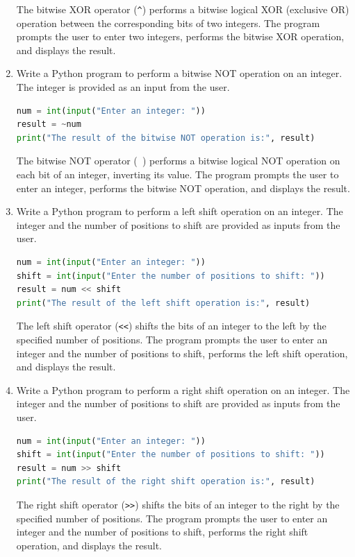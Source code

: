 \documentclass[12pt]{book}
\begin{document}
\begin{enumerate}
The bitwise XOR operator (\texttt{\^}) performs a bitwise logical XOR (exclusive OR) operation between the corresponding bits of two integers. The program prompts the user to enter two integers, performs the bitwise XOR operation, and displays the result.

\item Write a Python program to perform a bitwise NOT operation on an integer. The integer is provided as an input from the user.

\begin{lstlisting}[language=Python]
num = int(input("Enter an integer: "))
result = ~num
print("The result of the bitwise NOT operation is:", result)
\end{lstlisting}

The bitwise NOT operator (\texttt{~{}}) performs a bitwise logical NOT operation on each bit of an integer, inverting its value. The program prompts the user to enter an integer, performs the bitwise NOT operation, and displays the result.

\item Write a Python program to perform a left shift operation on an integer. The integer and the number of positions to shift are provided as inputs from the user.

\begin{lstlisting}[language=Python]
num = int(input("Enter an integer: "))
shift = int(input("Enter the number of positions to shift: "))
result = num << shift
print("The result of the left shift operation is:", result)
\end{lstlisting}

The left shift operator (\texttt{<<}) shifts the bits of an integer to the left by the specified number of positions. The program prompts the user to enter an integer and the number of positions to shift, performs the left shift operation, and displays the result.

\item Write a Python program to perform a right shift operation on an integer. The integer and the number of positions to shift are provided as inputs from the user.

\begin{lstlisting}[language=Python]
num = int(input("Enter an integer: "))
shift = int(input("Enter the number of positions to shift: "))
result = num >> shift
print("The result of the right shift operation is:", result)
\end{lstlisting}

The right shift operator (\texttt{>>}) shifts the bits of an integer to the right by the specified number of positions. The program prompts the user to enter an integer and the number of positions to shift, performs the right shift operation, and displays the result.


\end{enumerate}
\end{document}

